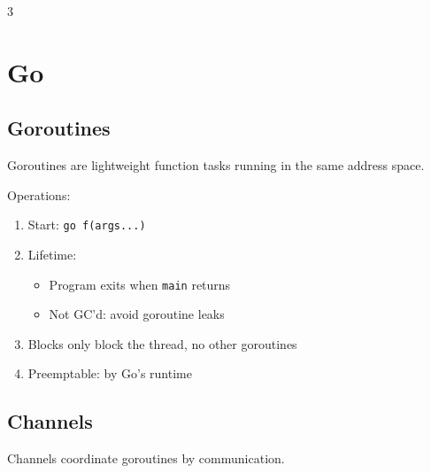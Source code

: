 \documentclass[12pt, a4paper]{article}
\begin{document}
\begin{multicols*}{3}
\section{Go}
\lstset{style=go}

\subsection{Goroutines}
Goroutines are lightweight function tasks running in the same address space.

Operations:
\begin{enumerate}[\roman*.]
  \item Start: \lstinline|go f(args...)|
  \item Lifetime:
    \begin{itemize}[leftmargin=*]\vspace{3pt}
      \item Program exits when \lstinline|main| returns 
      \item Not GC'd: avoid goroutine leaks
    \end{itemize}
  \item Blocks only block the thread, no other goroutines
  \item Preemptable: by Go's runtime
\end{enumerate}

\subsection{Channels}
Channels coordinate goroutines by communication.


\end{multicols*}
\end{document}
